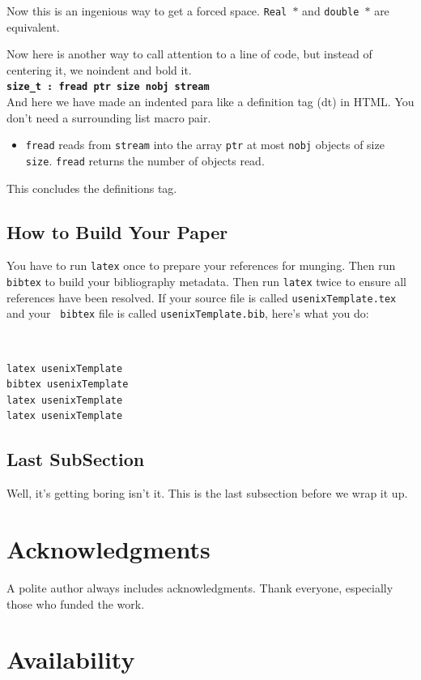 \documentclass[letterpaper,twocolumn,10pt]{article}
\begin{document}
Now this is an ingenious way to get a forced space.
{\tt Real~$*$} and {\tt double~$*$} are equivalent. 

Now here is another way to call attention to a line of code, but instead
of centering it, we noindent and bold it.\\

\noindent
{\bf \tt size\_t : fread ptr size nobj stream } \\

And here we have made an indented para like a definition tag (dt)
in HTML.  You don't need a surrounding list macro pair.
\begin{itemize}
\item[]  {\tt fread} reads from {\tt stream} into the array {\tt ptr} at
most {\tt nobj} objects of size {\tt size}.   {\tt fread} returns
the number of objects read. 
\end{itemize}
This concludes the definitions tag.

\subsection{How to Build Your Paper}

You have to run {\tt latex} once to prepare your references for
munging.  Then run {\tt bibtex} to build your bibliography metadata.
Then run {\tt latex} twice to ensure all references have been resolved.
If your source file is called {\tt usenixTemplate.tex} and your {\tt
  bibtex} file is called {\tt usenixTemplate.bib}, here's what you do:
{\tt \small
\begin{verbatim}
latex usenixTemplate
bibtex usenixTemplate
latex usenixTemplate
latex usenixTemplate
\end{verbatim}
}


\subsection{Last SubSection}

Well, it's getting boring isn't it.  This is the last subsection
before we wrap it up.

\section{Acknowledgments}

A polite author always includes acknowledgments.  Thank everyone,
especially those who funded the work. 

\section{Availability}
\end{document}
